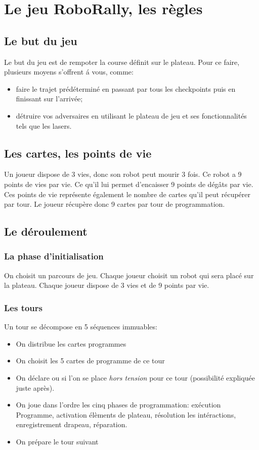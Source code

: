 \documentclass[a4paper,12pt]{report}
\begin{document}
   	\chapter{Le jeu RoboRally, les règles}

	\section{Le but du jeu}

Le but du jeu est de rempoter la course définit sur le plateau. Pour ce faire, plusieurs moyens s'offrent \'a vous, comme:
\begin{itemize}
\item faire le trajet prédéterminé en passant par tous les checkpoints puis en finissant sur l'arrivée;
\item détruire vos adversaires en utilisant le plateau de jeu et ses fonctionnalités tels que les lasers.
\end{itemize}

	\section{Les cartes, les points de vie}

Un joueur dispose de 3 vies, donc son robot peut mourir 3 fois. Ce robot a 9 points de vies par vie. Ce qu'il lui permet d'encaisser 9 points de dégâts par vie. Ces points de vie représente également le nombre de cartes qu'il peut récupérer par tour. Le joueur récupère donc 9 cartes par tour de programmation.

	\section{Le déroulement}

		\subsection{La phase d'initialisation}

On choisit un parcours de jeu. Chaque joueur choisit un robot qui sera placé sur la plateau. 	Chaque joueur dispose de 3 vies et de 9 points par vie.

		\subsection{Les tours}

Un tour se décompose en 5 séquences immuables:
\begin{itemize}
\item On distribue les cartes programmes
\item On choisit les 5 cartes de programme de ce tour
\item On déclare ou si l'on se place \textit{hors tension} pour ce tour (possibilité expliquée juste après).
\item On joue dans l'ordre les cinq phases de programmation: exécution Programme, activation élèments de plateau, résolution les intéractions, enregistrement drapeau, réparation.
\item On prépare le tour suivant
\end{itemize}
\end{document}
